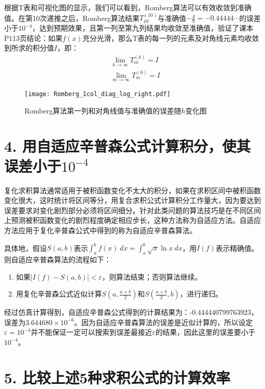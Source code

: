 根据T表和可视化图的显示，我们可以看到，Romberg算法可以有效收敛到准确值。在第10次递推之后，Romberg算法结果$T_{10}^{(10)}$与准确值$-\frac{4}{9}=-0.44444\cdots$的误差小于$10^{-4}$，达到预期效果，且第一列至第九列结果均收敛至准确值，验证了课本P113页结论：如果$f(x)$充分光滑，那么T表的每一列的元素及对角线元素均收敛到所求的积分值$I$，即：
\begin{equation*}
    \begin{aligned}
        & \lim_{k\rightarrow \infty} T_m^{(k)} = I \\    
        & \lim_{m\rightarrow \infty} T_m^{(0)} = I   
    \end{aligned}
\end{equation*}

\begin{figure}[t]
    \centering
    \texttt{[image: Romberg\_1col\_diag\_log\_right.pdf]} \\
    \caption{Romberg算法第一列和对角线值与准确值的误差随$h$变化图}
    \label{fig:Romberg_T}
\end{figure}
\newpage
\section*{4. 用自适应辛普森公式计算积分，使其误差小于$10^{-4}$}

复化求积算法通常适用于被积函数变化不太大的积分，如果在求积区间中被积函数变化很大，这时统计将区间等分，用复合求积公式计算积分工作量大，因为要达到误差要求对变化剧烈部分必须将区间细分。针对此类问题的算法技巧是在不同区间上预测被积函数变化的剧烈程度确定相应步长，这种方法称为自适应方法。自适应方法应用于复化辛普森公式中得到的称为自适应辛普森算法。

具体地，假设$S(a,b)$表示$\int_{a}^{b} f(x) \ dx = \int_{a}^{b} \sqrt{x} \ln x  \ dx$，用$I(f)$表示精确值。则自适应辛普森算法的流程如下：
\begin{enumerate}
    \item 如果$|I(f) - S(a,b) | < \varepsilon$，则算法结束；否则算法继续。
    \item 用复化辛普森公式近似计算$S(a, \frac{a+b}{2})$和$S(\frac{a+b}{2}, b)$，进行递归。
\end{enumerate}

经过仿真计算得到，自适应辛普森公式得到的计算结果为：-0.444440799763923，误差为$3.644680\times 10^{-6}$。因为自适应辛普森算法的误差是近似计算的，所以设定$\varepsilon = 10^{-4}$并不能保证一定可以搜索到误差最接近$\varepsilon$的结果，因此这里的误差要小于$10^{-4}$。
\newpage
\section*{5. 比较上述5种求积公式的计算效率}

